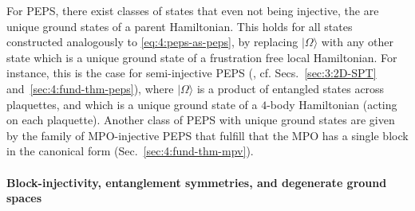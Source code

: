 \documentclass[rmp,aps,reprint,superscriptaddress,nobalancelastpage]{revtex4-1}
\newcommand{\ket}[1]{\vert#1\rangle}
\begin{document}
For PEPS, there exist classes of states that even not being injective, the are unique ground states of a parent Hamiltonian. This holds for all states constructed analogously to \eqref{eq:4:peps-as-peps}, by replacing $\ket\Omega$ with any other state which is a unique ground state of a frustration free local Hamiltonian. For instance, this is the case for semi-injective PEPS (\textcite{molnar:quasi-injective-peps}, cf. Secs.~\ref{sec:3:2D-SPT} and~\ref{sec:4:fund-thm-peps}), where $\ket\Omega$ is a product of entangled states across plaquettes, and which is a unique ground state of a $4$-body Hamiltonian (acting on each plaquette).
Another class of PEPS with unique ground states are given by the family of MPO-injective PEPS that fulfill that the MPO has a single block in the canonical form (Sec.~\ref{sec:4:fund-thm-mpv}).


\paragraph{Block-injectivity, entanglement symmetries, and degenerate ground spaces}
\end{document}
